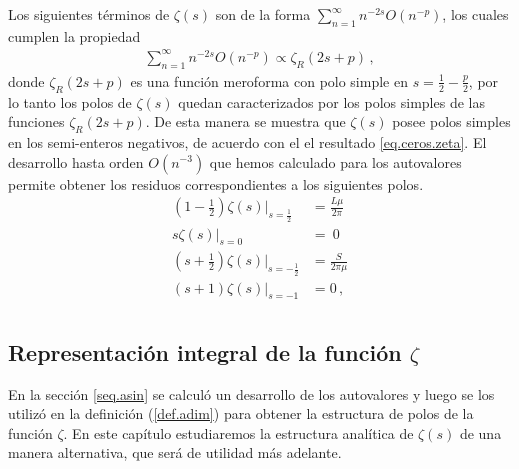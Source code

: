 Los siguientes términos de $\zeta (s)$ son de la forma $\sum _{n=1} ^{\infty} n ^{-2s} O ( n ^{-p})$, los cuales cumplen la propiedad
\begin{align}
	\sum _{n=1} ^{\infty} n ^{-2s} O ( n ^{-p}) 
	\propto
	\zeta _R (2s+p)
	\, ,
\end{align}
donde $\zeta _R (2s+p)$ es una función meroforma con polo simple en $s = \frac{1}{2} - \frac{p}{2}$,
por lo tanto los polos de $\zeta (s)$ quedan caracterizados por los polos simples de las funciones  $\zeta _R (2s+p)$. De esta manera se muestra que $\zeta (s)$ posee polos simples en los semi-enteros negativos, de acuerdo con el el resultado \eqref{eq.ceros.zeta}. El desarrollo hasta orden $O(n^{-3})$ que hemos calculado para los autovalores permite obtener los residuos correspondientes a los siguientes polos.
\begin{equation}
\begin{aligned}
\left(1- \frac{1}{2} \right) \zeta  (s)| _{s=\frac{1}{2}} &= 
\frac{L \mu }{2 \pi } \\[5pt]
s \zeta  (s) |_{s=0} &= \ 0 \\[5pt]
\left( s + \frac{1}{2} \right)\zeta  (s) | _{s=-\frac{1}{2}} &= \frac{S}{2 \pi \mu } \\[5pt]
(s+1) \zeta (s) |_{s=-1} &=  0
\, ,
\\[5pt]
\end{aligned}
\label{eq.polos.asin}
\end{equation}



\subsection{Representación integral de la función $\zeta$}
{\label{sec.complejo}}

En la sección \ref{seq.asin} se calculó un desarrollo de los autovalores y luego se
los utilizó en la definición (\ref{def.adim}) para obtener
la estructura de polos de la función $\zeta$. En este capítulo estudiaremos la
estructura analítica de $\zeta (s)$ de una manera alternativa, que será de utilidad
más adelante.

